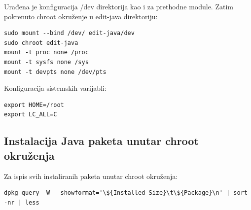 \documentclass[12pt,vi]{mitthesis}
\begin{document}
\noindent
Urađena je konfiguracija /dev direktorija kao i za prethodne module. Zatim pokrenuto chroot okruženje u edit-java direktoriju:
\begin{lstlisting}[style=BashInputStyle]
sudo mount --bind /dev/ edit-java/dev
sudo chroot edit-java
mount -t proc none /proc
mount -t sysfs none /sys
mount -t devpts none /dev/pts
\end{lstlisting}

\noindent
Konfiguracija sistemskih varijabli:
\begin{lstlisting}[style=BashInputStyle]
export HOME=/root
export LC_ALL=C
\end{lstlisting}

\subsection*{Instalacija Java paketa unutar chroot okruženja}
\noindent
Za ispis svih instaliranih paketa unutar chroot okruženja:
\begin{lstlisting}[style=BashInputStyle]
dpkg-query -W --showformat='\${Installed-Size}\t\${Package}\n' | sort -nr | less
\end{lstlisting}
\end{document}
